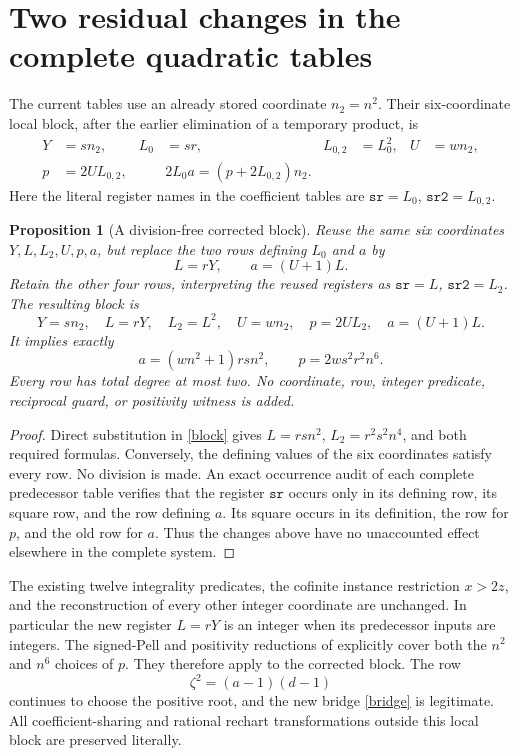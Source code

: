 \documentclass[11pt]{article}
\newtheorem{proposition}[theorem]{Proposition}
\begin{document}
\section{Two residual changes in the complete quadratic tables}

The current tables use an already stored coordinate \(n_2=n^2\).
Their six-coordinate local block, after the earlier elimination of
a temporary product, is
\begin{align*}
 Y&=sn_2,&L_0&=sr,&L_{0,2}&=L_0^2,&U&=wn_2,\\
 p&=2UL_{0,2},&&2L_0a=(p+2L_{0,2})n_2.
\end{align*}
Here the literal register names in the coefficient tables are
\(\mathtt{sr}=L_0\), \(\mathtt{sr2}=L_{0,2}\).

\begin{proposition}[A division-free corrected block]\label{two}
Reuse the same six coordinates \(Y,L,L_2,U,p,a\), but replace the
two rows defining \(L_0\) and \(a\) by
\[
                         L=rY,\qquad a=(U+1)L.
\]
Retain the other four rows, interpreting the reused registers as
\(\mathtt{sr}=L\), \(\mathtt{sr2}=L_2\). The resulting block is
\begin{equation}\label{block}
 Y=sn_2,\quad L=rY,\quad L_2=L^2,\quad U=wn_2,
 \quad p=2UL_2,\quad a=(U+1)L.
\end{equation}
It implies exactly
\[
                  a=(wn^2+1)rsn^2,
                  \qquad p=2ws^2r^2n^6.
\]
Every row has total degree at most two. No coordinate, row, integer
predicate, reciprocal guard, or positivity witness is added.
\end{proposition}
\begin{proof}
Direct substitution in \eqref{block} gives
\(L=rsn^2\), \(L_2=r^2s^2n^4\), and both required formulas.
Conversely, the defining values of the six coordinates satisfy every
row. No division is made. An exact occurrence audit of each complete
predecessor table verifies that the register \(\mathtt{sr}\)
occurs only in its defining row, its square row, and the row defining
\(a\). Its square occurs in its definition, the row for \(p\),
and the old row for \(a\). Thus the changes above have no unaccounted
effect elsewhere in the complete system.
\end{proof}

The existing twelve integrality predicates, the cofinite instance
restriction \(x>2z\), and the reconstruction of every other integer
coordinate are unchanged. In particular the new register \(L=rY\)
is an integer when its predecessor inputs are integers. The signed-Pell
and positivity reductions of \cite{Pell} explicitly cover both the
\(n^2\) and \(n^6\) choices of \(p\). They therefore apply to
the corrected block. The row
\[
                        \zeta^2=(a-1)(d-1)
\]
continues to choose the positive root, and the new bridge
\eqref{bridge} is legitimate. All coefficient-sharing and rational
rechart transformations outside this local block are preserved
literally.
\end{document}
